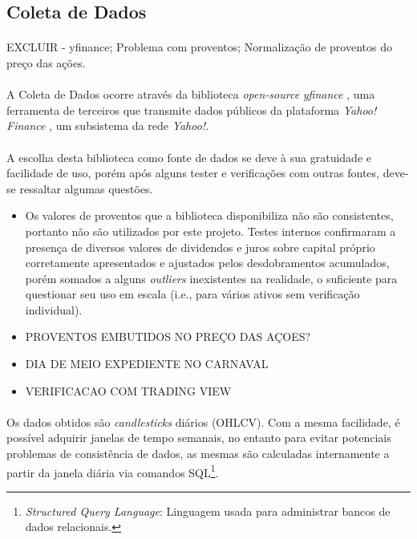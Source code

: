 \subsection{Coleta de Dados}

\paragraph{} EXCLUIR - yfinance; Problema com proventos; Normalização de proventos do preço das ações.

\paragraph{} A Coleta de Dados ocorre através da biblioteca \textit{open-source} \textit{yfinance} \cite{yfinance}, uma ferramenta de terceiros que transmite dados públicos da plataforma \textit{Yahoo! Finance} \cite{yahoo_finance}, um subsistema da rede \textit{Yahoo!}.

\paragraph{} A escolha desta biblioteca como fonte de dados se deve à sua gratuidade e facilidade de uso, porém após alguns tester e verificações com outras fontes, deve-se ressaltar algumas questões.

\begin{itemize}
    \item Os valores de proventos que a biblioteca disponibiliza não são consistentes, portanto não são utilizados por este projeto. Testes internos confirmaram a presença de diversos valores de dividendos e juros sobre capital próprio corretamente apresentados e ajustados pelos desdobramentos acumulados, porém somados a alguns \textit{outliers} inexistentes na realidade, o suficiente para questionar seu uso em escala (i.e., para vários ativos sem verificação individual).
    \item PROVENTOS EMBUTIDOS NO PREÇO DAS AÇOES?
    \item DIA DE MEIO EXPEDIENTE NO CARNAVAL
    \item VERIFICACAO COM TRADING VIEW
\end{itemize}

\paragraph{} Os dados obtidos são \textit{candlesticks} diários (OHLCV). Com a mesma facilidade, é possível adquirir janelas de tempo semanais, no entanto para evitar potenciais problemas de consistência de dados, as mesmas são calculadas internamente a partir da janela diária via comandos SQL\footnote{\textit{Structured Query Language}: Linguagem usada para administrar bancos de dados relacionais.}.







